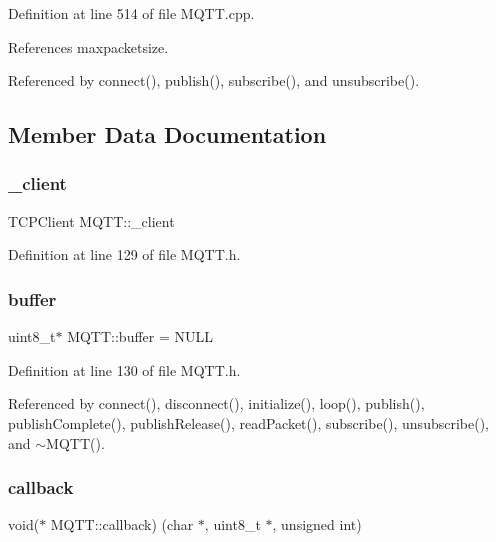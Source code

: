 Definition at line 514 of file M\+Q\+T\+T.\+cpp.



References maxpacketsize.



Referenced by connect(), publish(), subscribe(), and unsubscribe().



\subsection{Member Data Documentation}
\mbox{\label{class_m_q_t_t_a0180f906b9bbff0f2845900df0e5475d}} 
\subsubsection{\texorpdfstring{\+\_\+client}{\_client}}
{\footnotesize\ttfamily T\+C\+P\+Client M\+Q\+T\+T\+::\+\_\+client\hspace{0.3cm}{\ttfamily [private]}}



Definition at line 129 of file M\+Q\+T\+T.\+h.

\mbox{\label{class_m_q_t_t_a1d884782e6eec91dabe49b0bb4360a39}} 
\subsubsection{\texorpdfstring{buffer}{buffer}}
{\footnotesize\ttfamily uint8\+\_\+t$\ast$ M\+Q\+T\+T\+::buffer = N\+U\+LL\hspace{0.3cm}{\ttfamily [private]}}



Definition at line 130 of file M\+Q\+T\+T.\+h.



Referenced by connect(), disconnect(), initialize(), loop(), publish(), publish\+Complete(), publish\+Release(), read\+Packet(), subscribe(), unsubscribe(), and $\sim$\+M\+Q\+T\+T().

\mbox{\label{class_m_q_t_t_ad40d1645b7ec6c7b969883825f0c0469}} 
\subsubsection{\texorpdfstring{callback}{callback}}
{\footnotesize\ttfamily void($\ast$ M\+Q\+T\+T\+::callback) (char $\ast$, uint8\+\_\+t $\ast$, unsigned int)\hspace{0.3cm}{\ttfamily [private]}}




